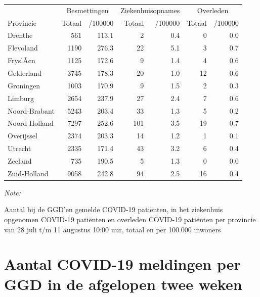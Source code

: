 \documentclass[
  english,
  man,floatsintext]{apa6}
\begin{document}
\begin{table}
\centering
\begin{threeparttable}
\begin{tabular}{lrrrrrr}
\toprule
\multicolumn{1}{c}{ } & \multicolumn{2}{c}{Besmettingen} & \multicolumn{2}{c}{Ziekenhuisopnames} & \multicolumn{2}{c}{Overleden} \\
\cmidrule(l{3pt}r{3pt}){2-3} \cmidrule(l{3pt}r{3pt}){4-5} \cmidrule(l{3pt}r{3pt}){6-7}
Provincie & Totaal & /100000 & Totaal & /100000 & Totaal & /100000\\
\midrule
Drenthe & 561 & 113.1 & 2 & 0.4 & 0 & 0.0\\
Flevoland & 1190 & 276.3 & 22 & 5.1 & 3 & 0.7\\
FryslÃ¢n & 1125 & 172.6 & 9 & 1.4 & 4 & 0.6\\
Gelderland & 3745 & 178.3 & 20 & 1.0 & 12 & 0.6\\
Groningen & 1003 & 170.9 & 9 & 1.5 & 2 & 0.3\\
Limburg & 2654 & 237.9 & 27 & 2.4 & 7 & 0.6\\
Noord-Brabant & 5243 & 203.4 & 33 & 1.3 & 5 & 0.2\\
Noord-Holland & 7297 & 252.6 & 101 & 3.5 & 19 & 0.7\\
Overijssel & 2374 & 203.3 & 14 & 1.2 & 1 & 0.1\\
Utrecht & 2335 & 171.4 & 43 & 3.2 & 6 & 0.4\\
Zeeland & 735 & 190.5 & 5 & 1.3 & 0 & 0.0\\
Zuid-Holland & 9058 & 242.8 & 94 & 2.5 & 16 & 0.4\\
\bottomrule
\end{tabular}
\begin{tablenotes}
\item \textit{Note: } 
\item Aantal bij de GGD’en gemelde COVID-19 patiënten, in het ziekenhuis opgenomen COVID-19 patiënten en overleden COVID-19 patiënten per provincie van 28 juli t/m 11 augustus 10:00 uur, totaal en per 100.000 inwoners
\end{tablenotes}
\end{threeparttable}
\end{table}

\newpage

\hypertarget{aantal-covid-19-meldingen-per-ggd-in-de-afgelopen-twee-weken}{%
\section{Aantal COVID-19 meldingen per GGD in de afgelopen twee weken}\label{aantal-covid-19-meldingen-per-ggd-in-de-afgelopen-twee-weken}}
\end{document}
